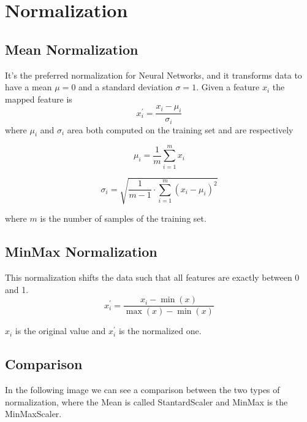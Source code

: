 \documentclass[oneside]{academica}
\begin{document}
\section{Normalization}

\subsection{Mean Normalization}

It’s the preferred normalization for Neural Networks, and it transforms data to have a mean $\mu = 0$ and a standard deviation $\sigma = 1$.
Given a feature $x_i$ the mapped feature is 
\begin{equation*}
  x_i^\prime = \frac{x_i - \mu_i}{\sigma_i}
\end{equation*}
where $\mu_i$ and $\sigma_i$ area both computed on the training set and are respectively

\begin{definition}[Mean]
  \begin{equation*}
    \mu_i = \frac{1}{m} \sum_{i=1}^{m} x_i
  \end{equation*}
\end{definition}

\begin{definition}
  \begin{equation*}
    \sigma_i = \sqrt{\frac{1}{m-1} \cdot \sum_{i=1}^{m} (x_i - \mu_i)^2}
  \end{equation*}
\end{definition}
where $m$ is the number of samples of the training set.

\subsection{MinMax Normalization}

This normalization shifts the data such that all features are exactly between 0 and 1.
\begin{equation*}
  x_i^\prime = \frac{x_i - \min(x)}{\max(x) - \min(x)}
\end{equation*}

$x_i$ is the original value and $x_i^\prime$ is the normalized one.

\subsection{Comparison}

In the following image we can see a comparison between the two types of normalization, where the Mean is called StantardScaler and MinMax is the MinMaxScaler.
\end{document}
